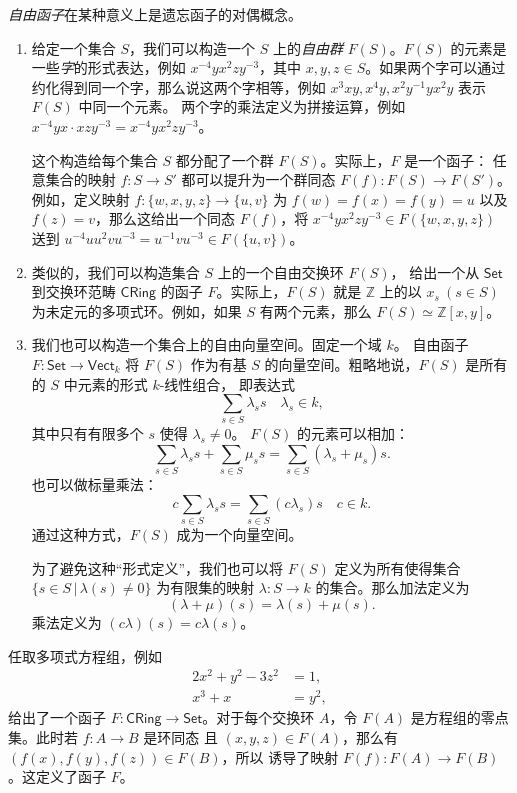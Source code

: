 \documentclass[fontset=none]{Notes}
\newcommand{\cat}[1]{\mathsf{#1}}
\begin{document}
\begin{example}
  \emph{自由函子}在某种意义上是遗忘函子的对偶概念。
  \begin{enumerate}
    \item 给定一个集合 $S$，我们可以构造一个 $S$ 上的\emph{自由群}
    $F(S)$。$F(S)$ 的元素是一些\emph{字}的形式表达，例如
    $x^{-4}yx^2zy^{-3}$，其中 $x,y,z\in S$。如果两个字可以通过
    约化得到同一个字，那么说这两个字相等，例如
    $x^3xy,x^4y,x^2y^{-1}yx^2y$ 表示 $F(S)$ 中同一个元素。
    两个字的乘法定义为拼接运算，例如 $x^{-4}yx\cdot xzy^{-3}=x^{-4}yx^2zy^{-3}$。

    这个构造给每个集合 $S$ 都分配了一个群 $F(S)$。实际上，$F$ 是一个函子：
    任意集合的映射 $f:S\to S'$ 都可以提升为一个群同态 $F(f):F(S)\to F(S')$。
    例如，定义映射 $f:\{w,x,y,z\}\to\{u,v\}$ 为 $f(w)=f(x)=f(y)=u$
    以及 $f(z)=v$，那么这给出一个同态
    $F(f)$，将 $x^{-4}yx^2zy^{-3}\in F(\{w,x,y,z\})$ 
    送到 $u^{-4}uu^2vu^{-3}=u^{-1}vu^{-3}\in F(\{u,v\})$。
    \item 类似的，我们可以构造集合 $S$ 上的一个自由交换环 $F(S)$，
    给出一个从 $\cat{Set}$ 到交换环范畴 $\cat{CRing}$ 
    的函子 $F$。实际上，$F(S)$ 就是 $\mathbb{Z}$ 上的以 $x_s\ (s\in S)$
    为未定元的多项式环。例如，如果 $S$ 有两个元素，那么
    $F(S)\simeq \mathbb{Z}[x,y]$。
    \item 我们也可以构造一个集合上的自由向量空间。固定一个域 $k$。
    自由函子 $F:\cat{Set}\to\cat{Vect}_k$ 将 $F(S)$ 作为有基 $S$
    的向量空间。粗略地说，$F(S)$ 是所有的 $S$ 中元素的形式 $k$-线性组合，
    即表达式
    \[
      \sum_{s\in S}\lambda_ss\quad \lambda_s\in k,  
    \]
    其中只有有限多个 $s$ 使得 $\lambda_s\neq 0$。
    $F(S)$ 的元素可以相加：
    \[
      \sum_{s\in S}\lambda_ss+\sum_{s\in S}\mu_ss=\sum_{s\in S}
      (\lambda_s+\mu_s)s.  
    \]
    也可以做标量乘法：
    \[
      c\sum_{s\in S}\lambda_ss=\sum_{s\in S}(c\lambda_s)s\quad c\in k.  
    \]
    通过这种方式，$F(S)$ 成为一个向量空间。

    为了避免这种“形式定义”，我们也可以将 $F(S)$ 定义为所有使得集合
    $\{s\in S\,|\, \lambda(s)\ne 0\}$ 为有限集的映射
    $\lambda:S\to k$ 的集合。那么加法定义为
    \[
      (\lambda+\mu)(s)=\lambda(s)+\mu(s).  
    \]
    乘法定义为 $(c\lambda)(s)=c\lambda(s)$。
  \end{enumerate}
\end{example}

\begin{example}
  任取多项式方程组，例如
  \begin{align}
    2x^2+y^2-3z^2&=1,\\
    x^3+x&=y^2,
  \end{align}
  给出了一个函子 $F:\cat{CRing}\to\cat{Set}$。对于每个交换环
  $A$，令 $F(A)$ 是方程组的零点集。此时若 $f:A\to B$ 是环同态
  且 $(x,y,z)\in F(A)$，那么有 $(f(x),f(y),f(z))\in F(B)$，所以
  诱导了映射 $F(f):F(A)\to F(B)$。这定义了函子 $F$。
\end{example}
\end{document}
